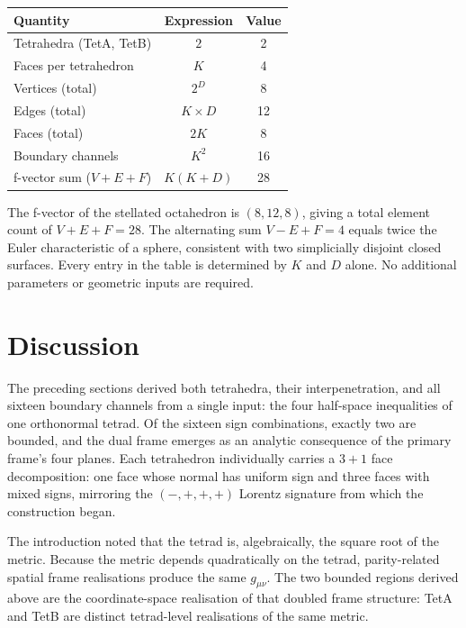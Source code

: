 \documentclass[twocolumn]{iopjournal}
\begin{document}
\vspace{6pt}
\noindent
\begin{tabular*}{\columnwidth}{@{\extracolsep{\fill}}lcc@{}}
\hline
Quantity & Expression & Value \\
\hline
Tetrahedra (TetA, TetB) & $2$ & 2 \\
Faces per tetrahedron & $K$ & 4 \\
Vertices (total) & $2^D$ & 8 \\
Edges (total) & $K \times D$ & 12 \\
Faces (total) & $2K$ & 8 \\
Boundary channels & $K^2$ & 16 \\
f-vector sum ($V\!+\!E\!+\!F$) & $K(K\!+\!D)$ & 28 \\
\hline
\end{tabular*}
\vspace{6pt}

\noindent
The f-vector of the stellated octahedron is $(8, 12, 8)$, giving a total element count of $V + E + F = 28$. The alternating sum $V - E + F = 4$ equals twice the Euler characteristic of a sphere, consistent with two simplicially disjoint closed surfaces. Every entry in the table is determined by $K$ and $D$ alone. No additional parameters or geometric inputs are required.


\section*{Discussion}

The preceding sections derived both tetrahedra, their interpenetration, and all sixteen boundary channels from a single input: the four half-space inequalities of one orthonormal tetrad. Of the sixteen sign combinations, exactly two are bounded, and the dual frame emerges as an analytic consequence of the primary frame's four planes. Each tetrahedron individually carries a $3+1$ face decomposition: one face whose normal has uniform sign and three faces with mixed signs, mirroring the $(-,+,+,+)$ Lorentz signature from which the construction began.

The introduction noted that the tetrad is, algebraically, the square root of the metric. Because the metric depends quadratically on the tetrad, parity-related spatial frame realisations produce the same $g_{\mu\nu}$. The two bounded regions derived above are the coordinate-space realisation of that doubled frame structure: TetA and TetB are distinct tetrad-level realisations of the same metric.
\end{document}
